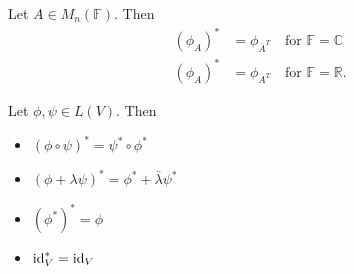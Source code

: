 \begin{corollary}
  Let $A \in M_n(\mathbb{F})$. Then
  \begin{align*}
    (\phi_A)^* &= \phi_{\bar{A}^T} \quad \text{for } \mathbb{F} = \mathbb{C} \\
    (\phi_A)^* &= \phi_{A^T} \quad \text{for } \mathbb{F} = \mathbb{R} 
  .\end{align*}
\end{corollary}

\begin{prop}
  Let $\phi, \psi \in L(V)$. Then
  \begin{itemize}
    \item $(\phi \circ \psi)^* = \psi^* \circ \phi^*$
    \item $(\phi + \lambda \psi)^* = \phi^* + \bar{\lambda} \psi^*$
    \item $(\phi^*)^* = \phi$
    \item $\mathrm{id}_V^* = \mathrm{id}_V$
  \end{itemize}
\end{prop}

